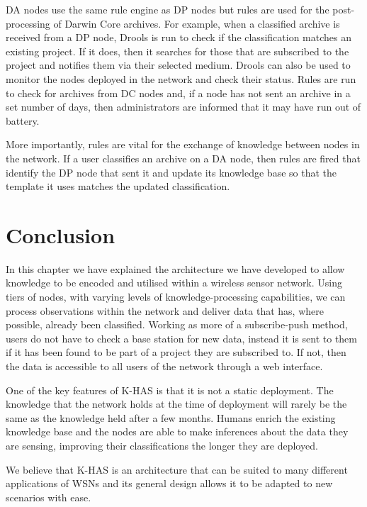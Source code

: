 		DA nodes use the same rule engine as DP nodes but rules are used for the post-processing of Darwin Core archives. For example, when a classified archive is received from a DP node, Drools is run to check if the classification matches an existing project. If it does, then it searches for those that are subscribed to the project and notifies them via their selected medium. Drools can also be used to monitor the nodes deployed in the network and check their status. Rules are run to check for archives from DC nodes and, if a node has not sent an archive in a set number of days, then administrators are informed that it may have run out of battery.
		
		More importantly, rules are vital for the exchange of knowledge between nodes in the network. If a user classifies an archive on a DA node, then rules are fired that identify the DP node that sent it and update its knowledge base so that the template it uses matches the updated classification.
		
	\section{Conclusion}
		In this chapter we have explained the architecture we have developed to allow knowledge to be encoded and utilised within a wireless sensor network. Using tiers of nodes, with varying levels of knowledge-processing capabilities, we can process observations within the network and deliver data that has, where possible, already been classified. Working as more of a subscribe-push method, users do not have to check a base station for new data, instead it is sent to them if it has been found to be part of a project they are subscribed to. If not, then the data is accessible to all users of the network through a web interface.
		
		One of the key features of K-HAS is that it is not a static deployment. The knowledge that the network holds at the time of deployment will rarely be the same as the knowledge held after a few months. Humans enrich the existing knowledge base and the nodes are able to make inferences about the data they are sensing, improving their classifications the longer they are deployed.
		
		We believe that K-HAS is an architecture that can be suited to many different applications of WSNs and its general design allows it to be adapted to new scenarios with ease.
		
			
			
			
			
			
			
			
			